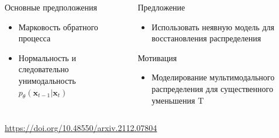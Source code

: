 \documentclass[8pt]{beamer}
\begin{document}
\begin{frame}
\begin{columns}
\begin{column}{0.55\textwidth}
		\end{column}
	\end{columns}


\begin{columns}
	\begin{column}{0.4\textwidth}
		
		\begin{block}{Основные предположения}
			
			\begin{itemize}	
				\item Марковость обратного процесса
				\item Нормальность и следовательно унимодальность $p_\theta(\textbf{x}_{t-1}|\textbf{x}_t)$
			\end{itemize}
		
		\end{block}
	
	\end{column}
	
	\begin{column}{0.57\textwidth}  
			\begin{block}{Предложение}
				\begin{itemize}
					\item Использовать неявную модель для восстановления распределения
				\end{itemize}
			\end{block}	
		\begin{block}{Мотивация}
			\begin{itemize}
				\item Моделирование мультимодального распределения для существенного уменьшения T
			\end{itemize}
		\end{block}	
	\end{column}
\end{columns}
\small{\url{https://doi.org/10.48550/arxiv.2112.07804}}
\end{frame}
\end{document}
